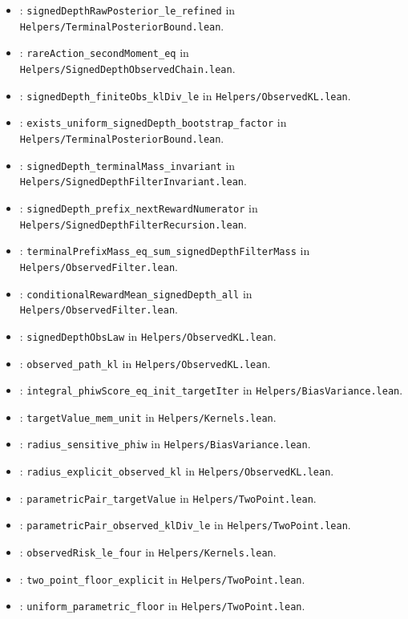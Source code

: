 \documentclass[11pt]{article}
\begin{document}
\begin{itemize}
\item {}: \texttt{signedDepthRawPosterior\_le\_refined} in \texttt{Helpers/TerminalPosteriorBound.lean}.
\item {}: \texttt{rareAction\_secondMoment\_eq} in \texttt{Helpers/SignedDepthObservedChain.lean}.
\item {}: \texttt{signedDepth\_finiteObs\_klDiv\_le} in \texttt{Helpers/ObservedKL.lean}.
\item {}: \texttt{exists\_uniform\_signedDepth\_bootstrap\_factor} in \texttt{Helpers/TerminalPosteriorBound.lean}.
\item {}: \texttt{signedDepth\_terminalMass\_invariant} in \texttt{Helpers/SignedDepthFilterInvariant.lean}.
\item {}: \texttt{signedDepth\_prefix\_nextRewardNumerator} in \texttt{Helpers/SignedDepthFilterRecursion.lean}.
\item {}: \texttt{terminalPrefixMass\_eq\_sum\_signedDepthFilterMass} in \texttt{Helpers/ObservedFilter.lean}.
\item {}: \texttt{conditionalRewardMean\_signedDepth\_all} in \texttt{Helpers/ObservedFilter.lean}.
\item {}: \texttt{signedDepthObsLaw} in \texttt{Helpers/ObservedKL.lean}.
\item {}: \texttt{observed\_path\_kl} in \texttt{Helpers/ObservedKL.lean}.
\item {}: \texttt{integral\_phiwScore\_eq\_init\_targetIter} in \texttt{Helpers/BiasVariance.lean}.
\item {}: \texttt{targetValue\_mem\_unit} in \texttt{Helpers/Kernels.lean}.
\item {}: \texttt{radius\_sensitive\_phiw} in \texttt{Helpers/BiasVariance.lean}.
\item {}: \texttt{radius\_explicit\_observed\_kl} in \texttt{Helpers/ObservedKL.lean}.
\item {}: \texttt{parametricPair\_targetValue} in \texttt{Helpers/TwoPoint.lean}.
\item {}: \texttt{parametricPair\_observed\_klDiv\_le} in \texttt{Helpers/TwoPoint.lean}.
\item {}: \texttt{observedRisk\_le\_four} in \texttt{Helpers/Kernels.lean}.
\item {}: \texttt{two\_point\_floor\_explicit} in \texttt{Helpers/TwoPoint.lean}.
\item {}: \texttt{uniform\_parametric\_floor} in \texttt{Helpers/TwoPoint.lean}.
\end{itemize}
\end{document}
